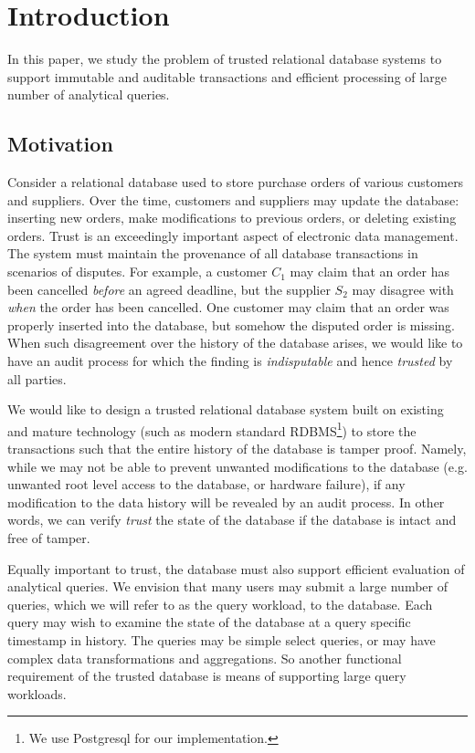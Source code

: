 \section{Introduction}

In this paper, we study the problem of trusted relational database systems to
support immutable and auditable transactions and efficient processing of large
number of analytical queries.

\subsection{Motivation}

Consider a relational database
used to store purchase orders of various customers and suppliers.  Over the time,
customers and suppliers may update the database: inserting new orders, 
make modifications to previous orders, or deleting existing orders.  Trust is an
exceedingly important aspect of electronic data management. The system must
maintain the provenance of all database transactions in scenarios of disputes.
For example, a customer $C_1$ may claim that an order has been cancelled {\em
before} an agreed deadline, but the
supplier $S_2$ may disagree with {\em when} the order has been cancelled.  One
customer may claim that an order was properly inserted into the database, but
somehow the disputed order is missing.  When such disagreement over the history
of the database arises, we would like to have an audit process for which the
finding is {\em indisputable} and hence {\em trusted} by all parties.

We would like to design a trusted relational database system built on existing
and mature technology (such as modern standard RDBMS\footnote{We use Postgresql
for our implementation.}) to store the transactions such that the entire history
of the database is tamper proof.  Namely, while we may not be able to prevent
unwanted modifications to the database (e.g. unwanted root level access to the
database, or hardware failure), if any modification to the data history will be
revealed by an audit process.  In other words, we can verify {\em trust} the
state of the database if the database is intact and free of tamper.

Equally important to trust, the database must also support efficient evaluation
of analytical queries.  We envision that many users may submit a large number of
queries, which we will refer to as the query workload, to the database.  Each
query may wish to examine the state of the database at a query specific timestamp
in history.  The queries may be simple select queries,
or may have complex data transformations and aggregations.  So another
functional requirement of the trusted database is means of supporting large
query workloads.


